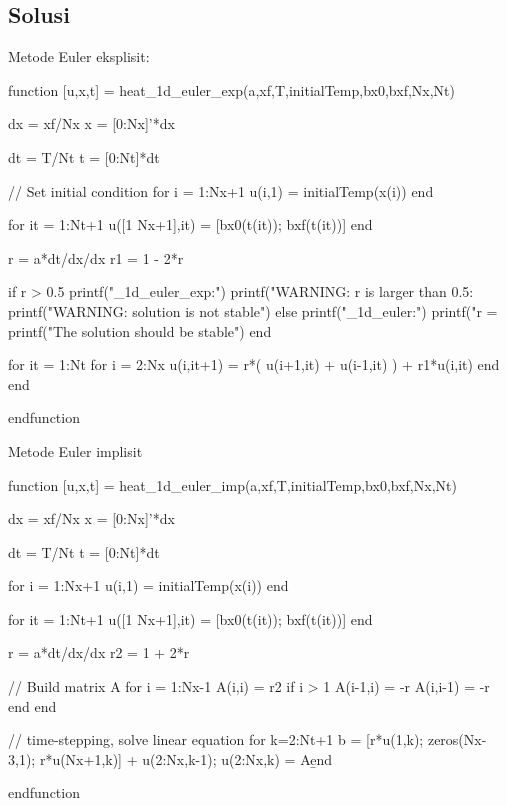 \documentclass[10pt,bahasa]{article}
\begin{document}
\subsection*{Solusi}

Metode Euler eksplisit:

\begin{scilabcode}
function [u,x,t] = heat_1d_euler_exp(a,xf,T,initialTemp,bx0,bxf,Nx,Nt)

  dx = xf/Nx
  x  = [0:Nx]'*dx
  
  dt = T/Nt
  t  = [0:Nt]*dt
  
  // Set initial condition
  for i = 1:Nx+1
    u(i,1) = initialTemp(x(i))
  end
    
  for it = 1:Nt+1
    u([1 Nx+1],it) = [bx0(t(it)); bxf(t(it))]
  end
    
  r  = a*dt/dx/dx
  r1 = 1 - 2*r
  
  if r > 0.5
    printf("\nheat_1d_euler_exp:\n")
    printf("WARNING: r is larger than 0.5: %
    printf("WARNING: solution is not stable\n\n")
  else
    printf("\nheat_1d_euler:\n")
    printf("r = %
    printf("The solution should be stable\n\n")
  end
  
  for it = 1:Nt
    for i = 2:Nx
      u(i,it+1) = r*( u(i+1,it) + u(i-1,it) ) + r1*u(i,it)
    end
  end
   
endfunction  
\end{scilabcode}

Metode Euler implisit

\begin{scilabcode}
function [u,x,t] = heat_1d_euler_imp(a,xf,T,initialTemp,bx0,bxf,Nx,Nt)

  dx = xf/Nx
  x  = [0:Nx]'*dx
  
  dt = T/Nt
  t  = [0:Nt]*dt
  
  for i = 1:Nx+1
    u(i,1) = initialTemp(x(i))
  end
  
  for it = 1:Nt+1
    u([1 Nx+1],it) = [bx0(t(it)); bxf(t(it))]
  end
  
  r  = a*dt/dx/dx
  r2 = 1 + 2*r
  
  // Build matrix A
  for i = 1:Nx-1
    A(i,i) = r2
    if i > 1
      A(i-1,i) = -r
      A(i,i-1) = -r
    end
  end
  
  // time-stepping, solve linear equation
  for k=2:Nt+1
    b = [r*u(1,k); zeros(Nx-3,1); r*u(Nx+1,k)] + u(2:Nx,k-1);
    u(2:Nx,k) = A\b
  end
  
endfunction  
\end{scilabcode}
\end{document}

